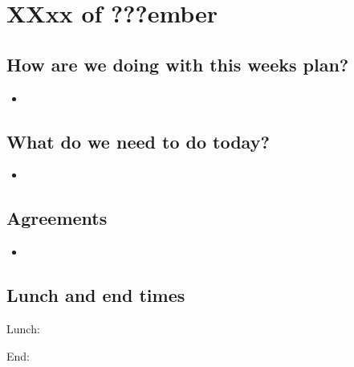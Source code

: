 \section{XXxx of ???ember}
\subsection{How are we doing with this weeks plan?}
\begin{itemize}
\item  
\end{itemize}

\subsection{What do we need to do today?}
\begin{itemize}
\item 
\end{itemize}

\subsection{Agreements}
\begin{itemize}
\item 
\end{itemize}
\subsection{Lunch and end times}
Lunch:

End: